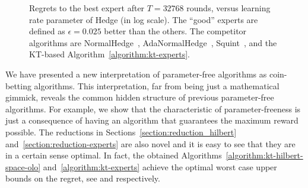 \begin{figure}[t]
\centering
{}
\caption{\footnotesize{Regrets to the best expert after $T = 32768$ rounds, versus learning rate parameter of Hedge (in log scale). The ``good'' experts are defined as $\epsilon=0.025$ better than the others. The competitor algorithms are NormalHedge~\cite{Chaudhuri-Freund-Hsu-2009}, AdaNormalHedge~\cite{Luo-Schapire-2015}, Squint~\cite{Koolen-van-Erven-2015}, and the KT-based Algorithm~\ref{algorithm:kt-experts}.}}
\label{fig:exp_lea}
\end{figure}

We have presented a new interpretation of parameter-free algorithms as coin-betting algorithms. This interpretation, far from being just a mathematical gimmick, reveals
the common hidden structure of previous parameter-free algorithms. For example,
we show that the characteristic of parameter-freeness is just a consequence of
having an algorithm that guarantees the maximum reward possible.
The reductions in Sections~\ref{section:reduction_hilbert} and~\ref{section:reduction-experts} are also novel and it is easy to see that they are in a
certain sense optimal. In fact, the obtained
Algorithms~\ref{algorithm:kt-hilbert-space-olo} and~\ref{algorithm:kt-experts}
achieve the optimal worst case upper bounds on the regret, see \cite{Streeter-McMahan-2012,Orabona-2013}
and \cite{Cesa-Bianchi-Lugosi-2006} respectively.


